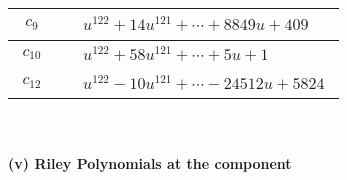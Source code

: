 \documentclass[1p]{elsarticle_modified}
\theoremstyle{definition}
\begin{document}
\begin{tabular}{m{50pt}|m{274pt}}
\hline $$\begin{aligned}c_{9}\end{aligned}$$&$\begin{aligned}
&u^{122}+14 u^{121}+\cdots+8849 u+409
\end{aligned}$\\
\hline $$\begin{aligned}c_{10}\end{aligned}$$&$\begin{aligned}
&u^{122}+58 u^{121}+\cdots+5 u+1
\end{aligned}$\\
\hline $$\begin{aligned}c_{12}\end{aligned}$$&$\begin{aligned}
&u^{122}-10 u^{121}+\cdots-24512 u+5824
\end{aligned}$\\
\hline
\end{tabular}\\~\\
\newpage\renewcommand{\arraystretch}{1}
\flushleft \textbf{(v) Riley Polynomials at the component}\newline \\
\end{document}
